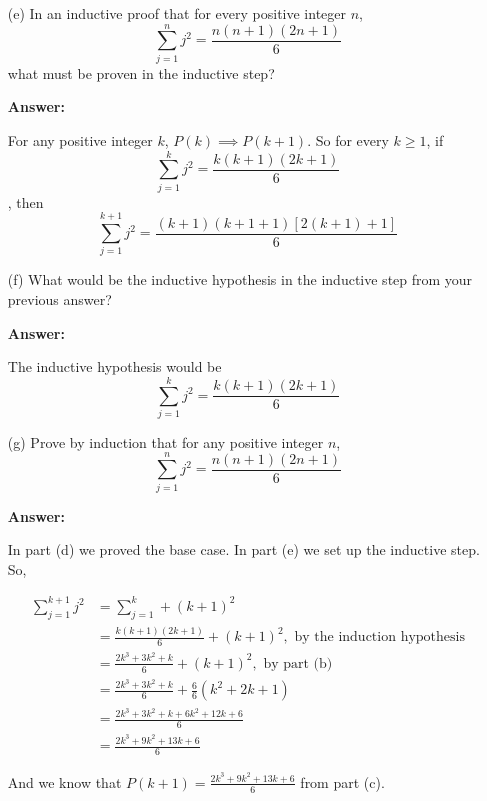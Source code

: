 \documentclass[14pt]{extreport}
\newcommand{\answer}[0]{\medskip \textbf{Answer:} \medskip}
\begin{document}
\begin{enumerate}
        \answer

        We must prove \( n = 1 \), so 
        \begin{align*}
            \sum_{j=1}^1 j^2 &= 1^2 \\
                             &= 1
        \end{align*}

        \begin{align*}
            \frac{1(1 + 1)(2 \cdot 1 + 1)}{6} &= \frac{1(2)(3)}{6} \\
                                              &= 1
        \end{align*}

    \item[(e)] In an inductive proof that for every positive integer \( n \),
    \[
        \sum_{j=1}^n j^2 = \frac{n(n + 1)(2n + 1)}{6}
    \] 
    what must be proven in the inductive step?

        \answer

        For any positive integer \( k \), \( P(k) \implies P(k + 1) \). So for every \( k \geq 1 \), if 
        \[
            \sum_{j=1}^k j^2 = \frac{k(k + 1)(2k + 1)}{6}
        \],
        then 
        \[
            \sum_{j=1}^{k + 1} j^2 = \frac{(k + 1)(k + 1 + 1)[2(k + 1) + 1]}{6}
        \]

    \item[(f)] What would be the inductive hypothesis in the inductive step from your previous answer?
    
        \answer

        The inductive hypothesis would be
        \[
            \sum_{j=1}^k j^2 = \frac{k(k + 1)(2k + 1)}{6}
        \]

    \item[(g)] Prove by induction that for any positive integer \( n \), 
    \[
        \sum_{j=1}^n j^2 = \frac{n(n + 1)(2n + 1)}{6}
    \]

        \answer

        In part (d) we proved the base case. In part (e) we set up the inductive step. So,

        \begin{align*}
            \sum_{j=1}^{k + 1} j^2 &= \sum_{j=1}^{k} + (k + 1)^2 \\
                                   &= \frac{k(k + 1)(2k + 1)}{6} + (k + 1)^2, \text{ by the induction hypothesis} \\
                                   &= \frac{2k^3 + 3k^2 + k}{6} + (k + 1)^2, \text{ by part (b)} \\
                                   &= \frac{2k^3 + 3k^2 + k}{6} + \frac{6}{6}(k^2 + 2k + 1) \\
                                   &= \frac{2k^3 + 3k^2 + k + 6k^2 + 12k + 6}{6} \\
                                   &= \frac{2k^3 + 9k^2 + 13k + 6}{6}
        \end{align*}

        And we know that \( P(k + 1) = \frac{2k^3 + 9k^2 + 13k + 6}{6} \) from part (c).

\end{enumerate}
\end{document}
